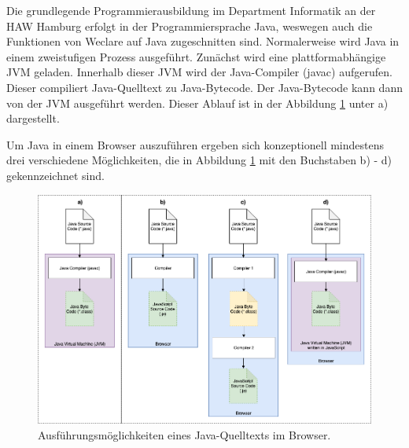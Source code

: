 Die grundlegende Programmierausbildung im Department Informatik an der HAW Hamburg erfolgt in der Programmiersprache Java, weswegen auch die Funktionen von Weclare auf Java zugeschnitten sind. Normalerweise wird Java in einem zweistufigen Prozess ausgeführt. Zunächst wird eine plattformabhängige JVM geladen. Innerhalb dieser JVM wird der Java-Compiler (javac) aufgerufen. Dieser compiliert Java-Quelltext zu Java-Bytecode. Der Java-Bytecode kann dann von der JVM ausgeführt werden. Dieser Ablauf ist in der Abbildung \ref{abb:java_execution} unter a) dargestellt.

Um Java in einem Browser auszuführen ergeben sich konzeptionell mindestens drei verschiedene Möglichkeiten, die in Abbildung \ref{abb:java_execution} mit den Buchstaben b) - d) gekennzeichnet sind.

\begin{figure}[H]
    \includegraphics[width=14cm]{chapter/entwurf/bilder/Java_JavaScript_Execution.png}
    \centering
    \caption{Ausführungsmöglichkeiten eines Java-Quelltexts im Browser.}
    \label{abb:java_execution}
\end{figure}

\newpage

